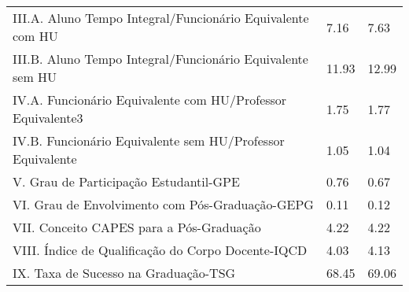 \documentclass{article}
\begin{document}
\begin{tabular}{lll}
III.A. Aluno Tempo Integral/Funcionário Equivalente com HU  &  7.16 &  7.63 \\
III.B. Aluno Tempo Integral/Funcionário Equivalente sem HU  &  11.93 &  12.99 \\
IV.A. Funcionário Equivalente com HU/Professor Equivalente3 &  1.75 &  1.77 \\
IV.B. Funcionário Equivalente sem HU/Professor Equivalente  &  1.05 &  1.04 \\
V. Grau de Participação Estudantil-GPE                      &  0.76 &  0.67 \\
VI. Grau de Envolvimento com Pós-Graduação-GEPG             &  0.11 &  0.12 \\
VII. Conceito CAPES para a Pós-Graduação                    &  4.22 &  4.22 \\
VIII. Índice de Qualificação do Corpo Docente-IQCD          &  4.03 &  4.13 \\
IX. Taxa de Sucesso na Graduação-TSG                        &  68.45 &  69.06 \\
\bottomrule
\end{tabular}
\newpage
\end{document}
